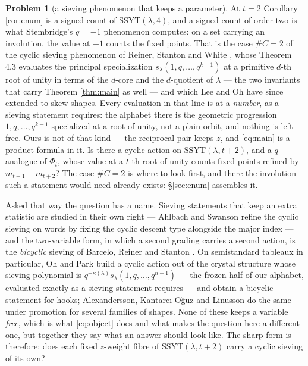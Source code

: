 \documentclass[11pt,reqno]{amsart}
\theoremstyle{plain}
\theoremstyle{definition}
\newtheorem{problem}[theorem]{Problem}
\begin{document}
\begin{problem}[a sieving phenomenon that keeps a parameter]\label{prob:sieving}
At $t=2$ Corollary \ref{cor:enum} is a signed count of $\mathrm{SSYT}(\lambda,4)$, and a signed count
of order two is what Stembridge's $q=-1$ phenomenon \cite{Ste94} computes: on a set carrying an
involution, the value at $-1$ counts the fixed points. That is the case $\#C=2$ of the cyclic sieving
phenomenon of Reiner, Stanton and White \cite{RSW04}, whose Theorem 4.3 evaluates the principal
specialization $s_\lambda(1,q,\dots,q^{k-1})$ at a primitive $d$-th root of unity in terms of the
$d$-core and the $d$-quotient of $\lambda$ --- the two invariants that carry Theorem \ref{thm:main}
as well --- and which Lee and Oh \cite{LO22} have since extended to skew shapes. Every evaluation in
that line is at a \emph{number}, as a sieving statement requires: the alphabet there is the geometric
progression $1,q,\dots,q^{k-1}$ specialized at a root of unity, not a plain orbit, and nothing is
left free. Ours is not of that kind --- the reciprocal pair keeps $z$, and \eqref{eq:main} is a
product formula in it. Is there a cyclic action on $\mathrm{SSYT}(\lambda,t+2)$, and a $q$-analogue of
$\Phi_t$, whose value at a $t$-th root of unity counts fixed points refined by $m_{t+1}-m_{t+2}$?
The case $\#C=2$ is where to look first, and there the involution such a statement would need already
exists: \S\ref{sec:enum} assembles it.

Asked that way the question has a name. Sieving statements that keep an extra statistic are studied
in their own right --- Ahlbach and Swanson \cite{AS18} refine the cyclic sieving on words by fixing
the cyclic descent type alongside the major index --- and the two-variable form, in which a second
grading carries a second action, is the \emph{bicyclic} sieving of Barcelo, Reiner and Stanton
\cite{BRS08}. On semistandard tableaux in particular, Oh and Park \cite{OP19} build a cyclic action
out of the crystal structure whose sieving polynomial is $q^{-\kappa(\lambda)}
s_\lambda(1,q,\dots,q^{n-1})$ --- the frozen half of our alphabet, evaluated exactly as a sieving
statement requires --- and obtain a bicyclic statement for hooks; Alexandersson, Kantarc\i{}
O\u{g}uz and Linusson \cite{AKL21} do the same under promotion for several families of shapes. None
of these keeps a variable \emph{free}, which is what \eqref{eq:object} does and what makes the
question here a different one, but together they say what an answer should look like. The sharp
form is therefore: does each fixed $z$-weight fibre of $\mathrm{SSYT}(\lambda,t+2)$ carry a cyclic
sieving of its own?


\end{problem}
\end{document}
